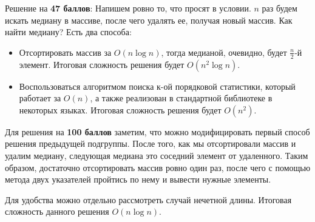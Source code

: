 Решение на \textbf{47 баллов}: Напишем ровно то, что просят в условии. $n$ раз будем искать медиану в массиве, после чего удалять ее, получая новый массив. Как найти медиану?
Есть два способа:
\begin{itemize}
\item Отсортировать массив за $O(n \log n)$, тогда медианой, очевидно, будет $\frac{n}{2}$-й элемент. Итоговая сложность решения будет $O(n^2 \log n)$.
\item Воспользоваться алгоритмом поиска к-ой порядковой статистики, который работает за $O(n)$, а также реализован в стандартной библиотеке в некоторых языках. Итоговая сложность решения будет $O(n^2)$.
\end{itemize}


Для решения на \textbf{100 баллов} заметим, что можно модифицировать первый способ решения предыдущей подгруппы. После того, как мы отсортировали массив и удалим медиану, следующая медиана это соседний элемент от удаленного. Таким образом, достаточно отсортировать массив ровно один раз, после чего с помощью метода двух указателей пройтись по нему и вывести нужные элементы.

Для удобства можно отдельно рассмотреть случай нечетной длины. Итоговая сложность данного решения $O(n \log n)$.
